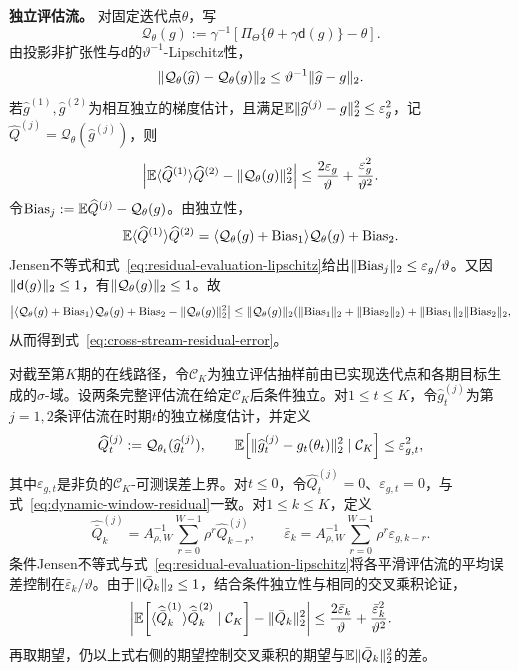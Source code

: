 \par\smallskip\noindent\textbf{独立评估流。}\quad
对固定迭代点$\theta$，写
\[
 \mathcal Q_\theta(g)
 :=\gamma^{-1}\!\left[\Pi_\Theta\{\theta+\gamma\mathsf d(g)\}-\theta\right].
\]
由投影非扩张性与$\mathsf d$的$\vartheta^{-1}$-Lipschitz性，
\begin{equation}\label{eq:residual-evaluation-lipschitz}
 \lVert\mathcal Q_\theta(\widehat g)-\mathcal Q_\theta(g)\rVert_2
 \le \vartheta^{-1}\lVert\widehat g-g\rVert_2.
\end{equation}
若$\widehat g^{(1)},\widehat g^{(2)}$为相互独立的梯度估计，且满足$\mathbb E\lVert\widehat g^{(j)}-g\rVert_2^2\le\varepsilon_g^2$，记$\widehat Q^{(j)}=\mathcal Q_\theta(\widehat g^{(j)})$，则
\begin{equation}\label{eq:cross-stream-residual-error}
 \left|
 \mathbb E\langle\widehat Q^{(1)}\rangle{\widehat Q^{(2)}}
 -\lVert\mathcal Q_\theta(g)\rVert_2^2
 \right|
 \le \frac{2\varepsilon_g}{\vartheta}
 +\frac{\varepsilon_g^2}{\vartheta^2}.
\end{equation}
令$\operatorname{Bias}_j:=\mathbb E\widehat Q^{(j)}-\mathcal Q_\theta(g)$。由独立性，
\[
 \mathbb E\langle\widehat Q^{(1)}\rangle{\widehat Q^{(2)}}
 =\langle\mathcal Q_\theta(g)+\operatorname{Bias}_1\rangle
 {\mathcal Q_\theta(g)+\operatorname{Bias}_2}.
\]
Jensen不等式和式~\eqref{eq:residual-evaluation-lipschitz}给出$\lVert\operatorname{Bias}_j\rVert_2\le\varepsilon_g/\vartheta$。又因$\lVert\mathsf d(g)\rVert_2\le1$，有$\lVert\mathcal Q_\theta(g)\rVert_2\le1$。故
\[
 \left|
 \langle\mathcal Q_\theta(g)+\operatorname{Bias}_1\rangle
 {\mathcal Q_\theta(g)+\operatorname{Bias}_2}
 -\lVert\mathcal Q_\theta(g)\rVert_2^2
 \right|
 \le \lVert\mathcal Q_\theta(g)\rVert_2
 (\lVert\operatorname{Bias}_1\rVert_2+\lVert\operatorname{Bias}_2\rVert_2)
 +\lVert\operatorname{Bias}_1\rVert_2\lVert\operatorname{Bias}_2\rVert_2,
\]
从而得到式~\eqref{eq:cross-stream-residual-error}。

对截至第$K$期的在线路径，令$\mathcal C_K$为独立评估抽样前由已实现迭代点和各期目标生成的$\sigma$-域。设两条完整评估流在给定$\mathcal C_K$后条件独立。对$1\le t\le K$，令$\widehat g_t^{(j)}$为第$j=1,2$条评估流在时期$t$的独立梯度估计，并定义
\[
 \widehat Q_t^{(j)}:=\mathcal Q_{\theta_t}(\widehat g_t^{(j)}),
 \qquad
 \mathbb E\!\left[\lVert\widehat g_t^{(j)}-g_t(\theta_t)\rVert_2^2
 \mid\mathcal C_K\right]\le\varepsilon_{g,t}^2,
\]
其中$\varepsilon_{g,t}$是非负的$\mathcal C_K$-可测误差上界。对$t\le0$，令$\widehat Q_t^{(j)}=0$、$\varepsilon_{g,t}=0$，与式~\eqref{eq:dynamic-window-residual}一致。对$1\le k\le K$，定义
\[
 \widehat{\bar Q}_k^{(j)}
 =A_{\rho,W}^{-1}\sum_{r=0}^{W-1}\rho^r\widehat Q_{k-r}^{(j)},
 \qquad
 \bar\varepsilon_k
 =A_{\rho,W}^{-1}\sum_{r=0}^{W-1}\rho^r\varepsilon_{g,k-r}.
\]
条件Jensen不等式与式~\eqref{eq:residual-evaluation-lipschitz}将各平滑评估流的平均误差控制在$\bar\varepsilon_k/\vartheta$。由于$\lVert\bar Q_k\rVert_2\le1$，结合条件独立性与相同的交叉乘积论证，
\begin{equation}\label{eq:cross-stream-dlr-error}
 \left|
 \mathbb E\!\left[\langle\widehat{\bar Q}_k^{(1)}\rangle{\widehat{\bar Q}_k^{(2)}}
 \mid\mathcal C_K\right]
 -\lVert\bar Q_k\rVert_2^2
 \right|
 \le \frac{2\bar\varepsilon_k}{\vartheta}
 +\frac{\bar\varepsilon_k^2}{\vartheta^2}.
\end{equation}
再取期望，仍以上式右侧的期望控制交叉乘积的期望与$\mathbb E\lVert\bar Q_k\rVert_2^2$的差。

